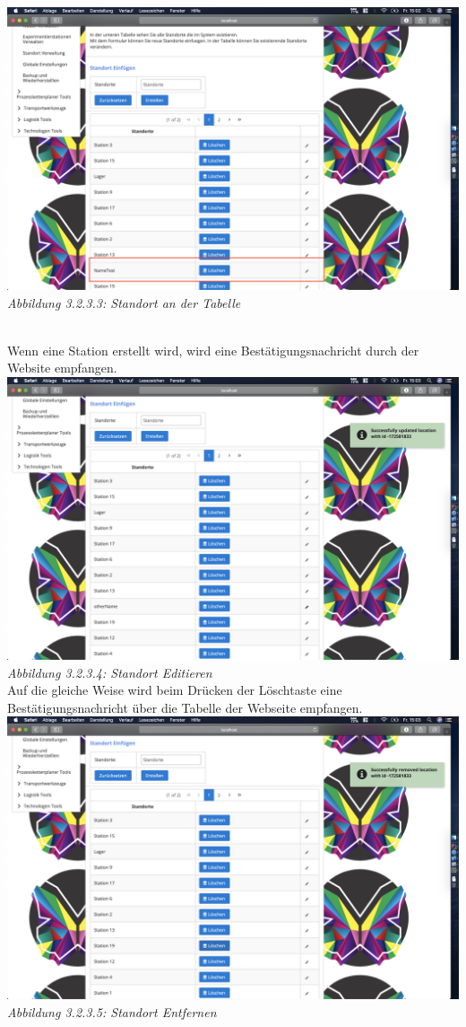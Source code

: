 \documentclass[enabledeprecatedfontcommands,fontsize=12pt,paper=a4,twoside]{scrartcl}
\begin{document}
\hypertarget{sc3.1.4.3}{
\includegraphics[width=1\textwidth]{Screenshots/4TestExperimentierteEstacion.png}
\textit{Abbildung 3.2.3.3: Standort an der Tabelle}
} \\
Wenn eine Station erstellt wird, wird eine Bestätigungsnachricht durch der Website empfangen.\\

\hypertarget{sc3.1.4.4}{
\includegraphics[width=1\textwidth]{Screenshots/4UpdateStantion.png}
\textit{Abbildung 3.2.3.4:  Standort Editieren}
} \\
Auf die gleiche Weise wird beim Drücken der Löschtaste eine Bestätigungsnachricht über die Tabelle der Webseite empfangen.\\

\hypertarget{sc3.1.4.5}{
\includegraphics[width=1\textwidth]{Screenshots/4RemoveStation.png}
\textit{Abbildung 3.2.3.5: Standort Entfernen}
} \\
\end{document}
